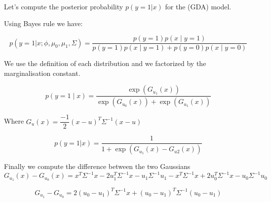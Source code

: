 \begin{answer}
  Let's compute the posterior probability $p(y=1 | x)$ for the (GDA) model.

  Using Bayes rule we have:

  \begin{equation}
    p(y=1| x; \phi, \mu_0,\mu_1,\Sigma) = \dfrac{p(y=1)p(x\;|\;y=1)}
    {p(y=1)p(x\;|\;y=1) + p(y=0)p(x\;|\;y=0)}
  \end{equation}

  We use the definition of each distribution and we factorized by
  the marginalisation constant.

  \begin{equation}
    p(y=1\;|\; x) = \dfrac{\exp(G_{u_1}(x))}{
    \exp(G_{u_0}(x)) + \exp(G_{u_1}(x))}
  \end{equation}

  Where $G_u(x) = \dfrac{-1}{2}(x - u)^T\Sigma^{-1}(x-u)$


  \begin{equation}
    p(y=1|x) = \dfrac{1}{ 1 + \exp(G_{u_1}(x)- G_{u2}(x))}
  \end{equation}

  Finally we compute the difference between the two Gaussians
  \newcommand{\precision}{\Sigma^{-1}}
  \begin{equation}
    G_{u_1}(x) - G_{u_0}(x) = x^T\precision x -2u_1^T\precision
    x -u_1\precision u_1 - x^T\precision x +2u_0^T\precision x -
    u_0\precision u_0
  \end{equation}

  \begin{equation}
    G_{u_1} - G_{u_0} = 2(u_0 - u_1)^T\precision x + (u_0 -
    u_1)^T\precision (u_0 - u_1)
  \end{equation}
\end{answer}
